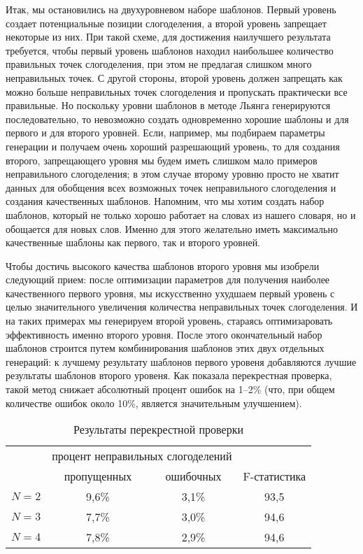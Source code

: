 \documentclass[12pt,a4paper,oneside]{extarticle}
\begin{document}
Итак, мы остановились на двухуровневом наборе шаблонов. Первый уровень создает потенциальные позиции слогоделения, а второй уровень запрещает некоторые из них. При такой схеме, для достижения наилучшего результата требуется, чтобы первый уровень шаблонов находил наибольшее количество правильных точек слогоделения, при этом не предлагая слишком много неправильных точек. С другой стороны, второй уровень должен запрещать как можно больше неправильных точек слогоделения и пропускать практически все правильные. Но поскольку уровни шаблонов в методе Льянга генерируются последовательно, то невозможно создать одновременно хорошие шаблоны и для первого и для второго уровней. Если, например, мы подбираем параметры генерации и получаем очень хороший разрешающий уровень, то для создания второго, запрещающего уровня мы будем иметь слишком мало примеров неправильного слогоделения; в этом случае второму уровню просто не хватит данных для обобщения всех возможных точек неправильного слогоделения и создания качественных шаблонов. Напомним, что мы хотим создать набор шаблонов, который не только хорошо работает на словах из нашего словаря, но и обощается для новых слов. Именно для этого желательно иметь максимально качественные шаблоны как первого, так и второго уровней.

Чтобы достичь высокого качества шаблонов второго уровня мы изобрели следующий прием: после оптимизации параметров для получения наиболее качественного первого уровня, мы искусственно ухудшаем первый уровень с целью значительного увеличения количества неправильных точек слогоделения. И на таких примерах мы генерируем второй уровень, стараясь оптимизаровать эффективность именно второго уровня. После этого окончательный набор шаблонов строится путем комбинирования шаблонов этих двух отдельных генераций: к лучшему результату шаблонов первого уровеня добавляются лучшие результаты шаблонов второго уровеня. Как показала перекрестная проверка, такой метод снижает абсолютный процент ошибок на 1--2\% (что, при общем количестве ошибок около 10\%, является значительным улучшением).

\begin{table}[ht]
\centering
\caption{Результаты перекрестной проверки \label{validation_results}}
\begin{tabular}{cccc}
		&	\multicolumn{2}{c}{процент неправильных слогоделений} & \\
		&	пропущенных		& ошибочных	& F-статистика \\
\hline
$N = 2$	& 	9,6\%			& 	3,1\% 	&	93,5 \\
$N = 3$ 	& 	7,7\%			& 	3,0\% 	& 	94,6	\\
$N = 4$ 	&	7,8\%			& 	2,9\% 	& 	94,6	\\
\hline
\end{tabular}
\end{table}
\end{document}
